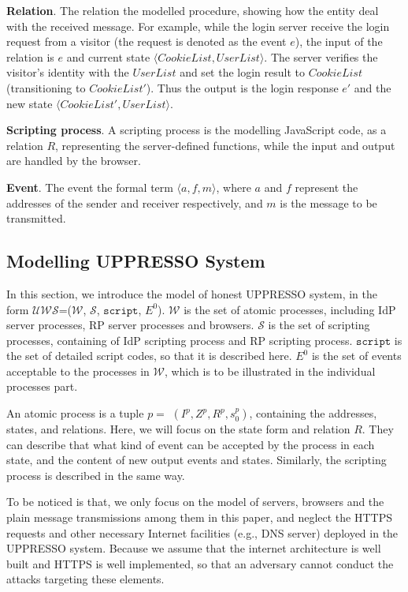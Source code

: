 \vspace{1mm}
\noindent\textbf{Relation}. The relation the modelled procedure, showing how the entity deal with the received message. For example, while the login server receive the login request from a visitor (the request is denoted as the event $e$), the input of the relation is $e$ and current state $\langle CookieList,UserList \rangle$.   The server verifies the visitor's identity with the $UserList$ and set the login result to $CookieList$ (transitioning to $CookieList'$). Thus the output is the login response $e'$ and the new state $\langle CookieList',UserList \rangle$.


\vspace{1mm}
\noindent\textbf{Scripting process}. A scripting process is the modelling JavaScript code, as a relation $R$, representing the server-defined functions, while the input and output are handled by the browser.


\vspace{1mm}
\noindent\textbf{Event}. The event  the formal term $\langle a, f, m \rangle$, where $a$ and $f$ represent the addresses of the sender and receiver respectively, and $m$ is the message to be transmitted.





\subsection{Modelling UPPRESSO System}
In this section, we introduce the model of honest UPPRESSO system, in the form $\mathcal{UWS}$=($\mathcal{W}$, $\mathcal{S}$, $\mathtt{script}$, $E^0$).
$\mathcal{W}$ is the set of atomic processes, including IdP server processes, RP server processes and browsers.
$\mathcal{S}$ is the set of scripting processes, containing of IdP scripting process and RP scripting process.
$\mathtt{script}$ is the set of detailed script codes, so that it is described here.
$E^0$  is the set of events acceptable to the processes in $\mathcal{W}$, which is to be illustrated in the individual processes part.

An atomic process is a tuple $p=$ $(I^p, Z^p, R^p,s_0^p )$, containing the addresses, states, and relations.
Here, we will focus on the state form and relation $R$. They can describe that what kind of event can be accepted by the process in each state, and the content of new output events and states.
Similarly, the scripting process is described in the same way.

To be noticed is that, we only focus on the model of servers, browsers and the plain message transmissions among them in this paper, and neglect the HTTPS requests and other necessary Internet facilities (e.g., DNS server) deployed in the UPPRESSO system.
Because we assume that the internet architecture is well  built and HTTPS is well implemented, so that an adversary cannot conduct the attacks targeting these elements.

